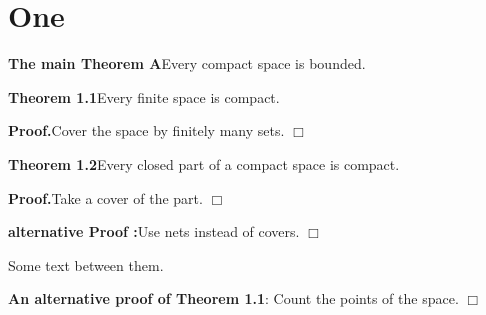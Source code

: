 \documentclass{article}
\begin{document}
\section{One}

{\bf The main Theorem A}\quad Every compact space is bounded.

{\bf Theorem 1.1}\quad Every finite space is compact.

{\bf Proof.}\quad Cover the space by finitely many sets. $\Box$

{\bf Theorem 1.2}\quad Every closed part of a compact space is compact.

{\bf Proof.}\quad Take a cover of the part. $\Box$

{\bf alternative Proof :}\quad Use nets instead of covers. $\Box$

Some text between them.

{\bf An alternative proof of Theorem 1.1}: \quad Count the points of the space. $\Box$
\end{document}

